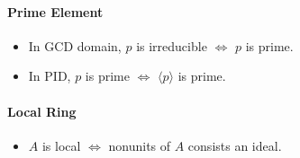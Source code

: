 \documentclass{article}
\begin{document}
\paragraph*{Prime Element}
\begin{itemize}
    \item In GCD domain, $p$ is irreducible $\Leftrightarrow$ $p$ is prime.
    \item In PID, $p$ is prime $\Leftrightarrow$ $\langle p \rangle$ is prime.
\end{itemize}

\paragraph*{Local Ring}
\begin{itemize}
    \item $A$ is local $\Leftrightarrow$ nonunits of $A$ consists an ideal.
\end{itemize}

% 
% 
\end{document}
